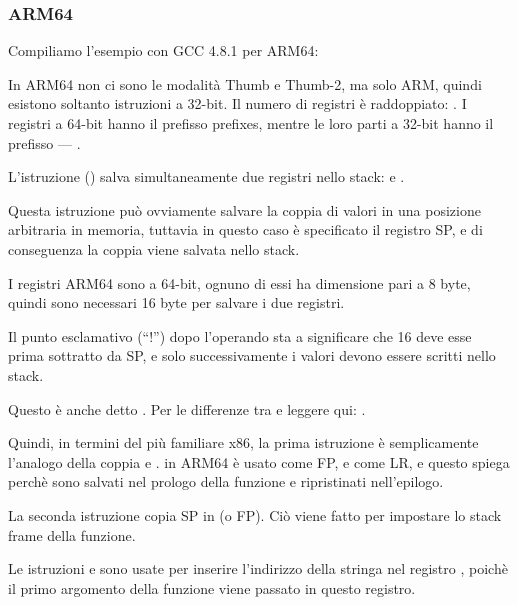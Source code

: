 \subsubsection{ARM64}


Compiliamo l'esempio con GCC 4.8.1 per ARM64:



In ARM64 non ci sono le modalità Thumb e Thumb-2, ma solo ARM, quindi esistono soltanto istruzioni a 32-bit.
Il numero di registri è raddoppiato: .
I registri a 64-bit hanno il prefisso  prefixes, mentre le loro parti a 32-bit hanno il prefisso --- .

L'istruzione  ()
salva simultaneamente due registri nello stack:  e .

Questa istruzione può ovviamente salvare la coppia di valori in una posizione arbitraria in memoria, tuttavia in questo caso è
specificato il registro \ac{SP}, e di conseguenza la coppia viene salvata nello stack.

I registri ARM64 sono a 64-bit, ognuno di essi ha dimensione pari a 8 byte, quindi sono necessari 16 byte per salvare i due registri.

Il punto esclamativo (``!'') dopo l'operando sta a significare che 16 deve esse prima sottratto da \ac{SP}, e solo successivamente
i valori devono essere scritti nello stack.

Questo è anche detto .
Per le differenze tra  e 
leggere qui: .

Quindi, in termini del più familiare x86, la prima istruzione è semplicamente l'analogo della coppia
 e .
 in ARM64 è usato come \ac{FP}, e 
come \ac{LR}, e questo spiega perchè sono salvati nel prologo della funzione e ripristinati nell'epilogo.

La seconda istruzione copia \ac{SP} in  (o \ac{FP}).
Ciò viene fatto per impostare lo stack frame della funzione.

\label{pointers_ADRP_and_ADD}
Le istruzioni  e \ADD sono usate per inserire
l'indirizzo della stringa  nel registro ,
poichè il primo argomento della funzione viene passato in questo registro.

